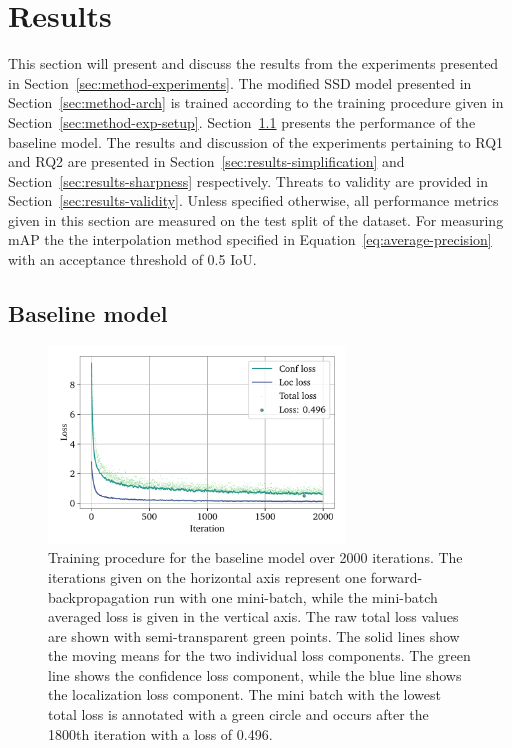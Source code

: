 \chapter{Results}\label{cha:results}

This section will present and discuss the results from the experiments presented in Section~\ref{sec:method-experiments}.
The modified SSD model presented in Section~\ref{sec:method-arch} is trained according to the training procedure given in Section~\ref{sec:method-exp-setup}.
Section~\ref{sec:results-baseline} presents the performance of the baseline model.
The results and discussion of the experiments pertaining to RQ1 and RQ2 are presented in Section~\ref{sec:results-simplification} and Section~\ref{sec:results-sharpness} respectively.
Threats to validity are provided in Section~\ref{sec:results-validity}.
Unless specified otherwise, all performance metrics given in this section are measured on the test split of the dataset.
For measuring mAP the the interpolation method specified in Equation~\ref{eq:average-precision} with an acceptance threshold of 0.5 IoU.

\section{Baseline model}\label{sec:results-baseline}
\begin{figure}[htbp]
    \centering
    \includegraphics[width=0.7\textwidth]{figs/results/baseline/loss2.pdf}
    \caption[Baseline training procedure]{%
Training procedure for the baseline model over 2000 iterations.
The iterations given on the horizontal axis represent one forward-backpropagation run with one mini-batch, while the mini-batch averaged loss is given in the vertical axis.
The raw total loss values are shown with semi-transparent green points.
The solid lines show the moving means for the two individual loss components.
The green line shows the confidence loss component, while the blue line shows the localization loss component.
The mini batch with the lowest total loss is annotated with a green circle and occurs after the 1800th iteration with a loss of 0.496.
    }\label{fig:method-baseline-loss}
  \end{figure}

